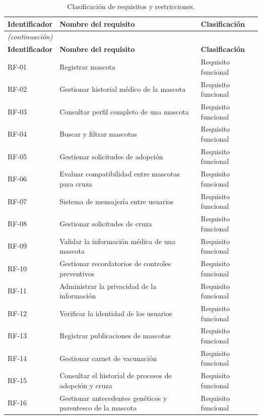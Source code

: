 \documentclass[journal,onecolumn]{IEEEtran}
\begin{document}
	\begin{longtable}{@{}p{2.2cm} p{7.5cm} p{3.5cm}@{}}
		\caption{Clasificación de requisitos y restricciones.}
		\label{tab:lista_requisitos_completa} \\
		\hline
		\textbf{Identificador} & \textbf{Nombre del requisito} & \textbf{Clasificación} \\
		\hline
		\endfirsthead
		\multicolumn{3}{|l|}{\textit{(continuación)}} \\
		\hline
		\textbf{Identificador} & \textbf{Nombre del requisito} & \textbf{Clasificación} \\
		\hline
		\endhead
		\hline
		\endfoot
		RF-01 & Registrar mascota & Requisito funcional \\
		\hline
		RF-02 & Gestionar historial médico de la mascota & Requisito funcional \\
		\hline
		RF-03 & Consultar perfil completo de una mascota & Requisito funcional \\
		\hline
		RF-04 & Buscar y filtrar mascotas & Requisito funcional \\
		\hline
		RF-05 & Gestionar solicitudes de adopción & Requisito funcional \\
		\hline
		RF-06 & Evaluar compatibilidad entre mascotas para cruza & Requisito funcional \\
		\hline
		RF-07 & Sistema de mensajería entre usuarios & Requisito funcional \\
		\hline
		RF-08 & Gestionar solicitudes de cruza & Requisito funcional \\
		\hline
		RF-09 & Validar la información médica de una mascota & Requisito funcional \\
		\hline
		RF-10 & Gestionar recordatorios de controles preventivos & Requisito funcional \\
		\hline
		RF-11 & Administrar la privacidad de la información & Requisito funcional \\
		\hline
		RF-12 & Verificar la identidad de los usuarios & Requisito funcional \\
		\hline
		RF-13 & Registrar publicaciones de mascotas & Requisito funcional \\
		\hline
		RF-14 & Gestionar carnet de vacunación & Requisito funcional \\
		\hline
		RF-15 & Consultar el historial de procesos de adopción y cruza & Requisito funcional \\
		\hline
		RF-16 & Gestionar antecedentes genéticos y parentesco de la mascota & Requisito funcional \\

\end{longtable}
\end{document}
